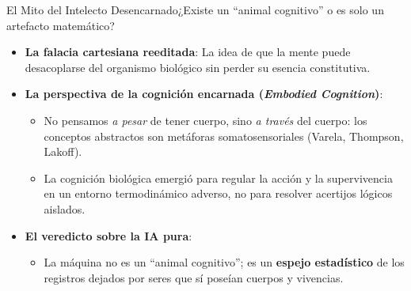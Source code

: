 \documentclass[aspectratio=169,11pt]{beamer}
\begin{document}
\begin{frame}{El Mito del Intelecto Desencarnado}{¿Existe un
  ``animal cognitivo'' o es solo un artefacto matemático?}
\begin{itemize}\setlength{\itemsep}{0.6em}
    \item \textbf{La falacia cartesiana reeditada}: La idea de que
      la mente puede desacoplarse del organismo biológico sin perder
      su esencia constitutiva.
    \item \textbf{La perspectiva de la cognición encarnada
      (\textit{Embodied Cognition})}:
    \begin{itemize}\setlength{\itemsep}{0.3em}
        \item No pensamos \textit{a pesar} de tener cuerpo, sino
          \textit{a través} del cuerpo: los conceptos abstractos son
          metáforas somatosensoriales (Varela, Thompson, Lakoff).
        \item La cognición biológica emergió para regular la acción
          y la supervivencia en un entorno termodinámico adverso, no
          para resolver acertijos lógicos aislados.
      \end{itemize}
    \item \textbf{El veredicto sobre la IA pura}:
    \begin{itemize}\setlength{\itemsep}{0.3em}
        \item La máquina no es un ``animal cognitivo''; es un
          \textbf{espejo estadístico} de los registros dejados por
          seres que sí poseían cuerpos y vivencias.
      \end{itemize}
  \end{itemize}
\end{frame}
\end{document}
